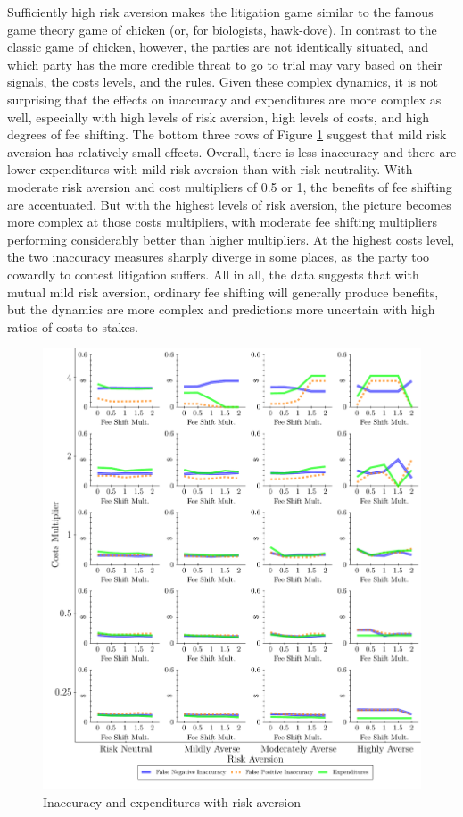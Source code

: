 \documentclass{article}
\begin{document}
Sufficiently high risk aversion makes the litigation game similar to the famous game theory game of chicken (or, for biologists, hawk-dove). In contrast to the classic game of chicken, however, the parties are not identically situated, and which party has the more credible threat to go to trial may vary based on their signals, the costs levels, and the rules. Given these complex dynamics, it is not surprising that the effects on inaccuracy and expenditures are more complex as well, especially with high levels of risk aversion, high levels of costs, and high degrees of fee shifting. The bottom three rows of Figure \ref{fig:accexp_riskaversion} suggest that mild risk aversion has relatively small effects. Overall, there is less inaccuracy and there are lower expenditures with mild risk aversion than with risk neutrality. With moderate risk aversion and cost multipliers of 0.5 or 1, the benefits of fee shifting are accentuated. But with the highest levels of risk aversion, the picture becomes more complex at those costs multipliers, with moderate fee shifting multipliers performing considerably better than higher multipliers. At the highest costs level, the two inaccuracy measures sharply diverge in some places, as the party too cowardly to contest litigation suffers.  All in all, the data suggests that with mutual mild risk aversion, ordinary fee shifting will generally produce benefits, but the dynamics are more complex and predictions more uncertain with high ratios of costs to stakes.

\begin{figure}[h!]
\centering
\includegraphics[scale=0.50, trim={0in 0in 0in 0in}, clip]{../Figures/Accuracy and Expenditures Varying Risk Aversion.pdf}
\caption{Inaccuracy and expenditures with risk aversion}
\label{fig:accexp_riskaversion}
\end{figure}
\end{document}
